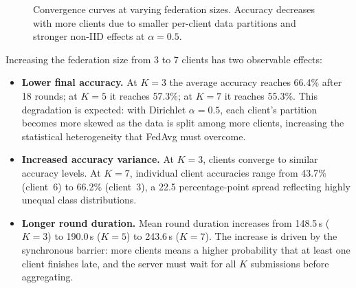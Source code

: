 \documentclass[12pt,a4paper]{report}
\begin{document}
\begin{figure}[H]
\centering
{}
\caption{Convergence curves at varying federation sizes.  Accuracy
  decreases with more clients due to smaller per-client data partitions
  and stronger non-IID effects at $\alpha = 0.5$.}
\label{fig:convergence_scale}
\end{figure}

Increasing the federation size from 3 to 7 clients has two observable
effects:

\begin{itemize}
  \item \textbf{Lower final accuracy.}  At $K = 3$ the average accuracy
        reaches 66.4\% after 18 rounds; at $K = 5$ it reaches 57.3\%;
        at $K = 7$ it reaches 55.3\%.  This degradation is expected: with
        Dirichlet $\alpha = 0.5$, each client's partition becomes more
        skewed as the data is split among more clients, increasing the
        statistical heterogeneity that FedAvg must overcome.

  \item \textbf{Increased accuracy variance.}  At $K = 3$, clients converge
        to similar accuracy levels.  At $K = 7$, individual client
        accuracies range from 43.7\% (client~6) to 66.2\% (client~3),
        a 22.5 percentage-point spread reflecting highly unequal class
        distributions.

  \item \textbf{Longer round duration.}  Mean round duration increases
        from 148.5\,s ($K = 3$) to 190.0\,s ($K = 5$) to 243.6\,s
        ($K = 7$).  The increase is driven by the synchronous barrier:
        more clients means a higher probability that at least one client
        finishes late, and the server must wait for all $K$ submissions
        before aggregating.
\end{itemize}
\end{document}
